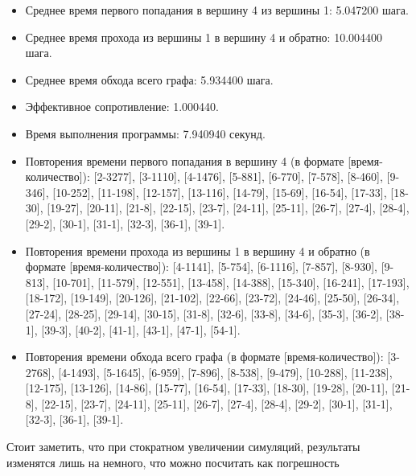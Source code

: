 \documentclass[utf8x]{G7-32} %
\begin{document}
\begin{itemize}
    \item Среднее время первого попадания в вершину 4 из вершины 1: 5.047200 шага.
    \item Среднее время прохода из вершины 1 в вершину 4 и обратно: 10.004400 шага.
    \item Среднее время обхода всего графа: 5.934400 шага.
    \item Эффективное сопротивление: 1.000440.
    \item Время выполнения программы: 7.940940 секунд.
    \item Повторения времени первого попадания в вершину 4 (в формате [время-количество]):
[2-3277], [3-1110], [4-1476], [5-881], [6-770], [7-578], [8-460], [9-346], [10-252], [11-198], [12-157], [13-116], [14-79], [15-69], [16-54], [17-33], [18-30], [19-27], [20-11], [21-8], [22-15], [23-7], [24-11], [25-11], [26-7], [27-4], [28-4], [29-2], [30-1], [31-1], [32-3], [36-1], [39-1].
    \item Повторения времени прохода из вершины 1 в вершину 4 и обратно (в формате [время-количество]):
[4-1141], [5-754], [6-1116], [7-857], [8-930], [9-813], [10-701], [11-579], [12-551], [13-458], [14-388], [15-340], [16-241], [17-193], [18-172], [19-149], [20-126], [21-102], [22-66], [23-72], [24-46], [25-50], [26-34], [27-24], [28-25], [29-14], [30-15], [31-8], [32-6], [33-8], [34-6], [35-3], [36-2], [38-1], [39-3], [40-2], [41-1], [43-1], [47-1], [54-1].
    \item Повторения времени обхода всего графа (в формате [время-количество]):
[3-2768], [4-1493], [5-1645], [6-959], [7-896], [8-538], [9-479], [10-288], [11-238], [12-175], [13-126], [14-86], [15-77], [16-54], [17-33], [18-30], [19-28], [20-11], [21-8], [22-15], [23-7], [24-11], [25-11], [26-7], [27-4], [28-4], [29-2], [30-1], [31-1], [32-3], [36-1], [39-1].
\end{itemize}
Стоит заметить, что при стократном увеличении симуляций, результаты изменятся лишь на немного, что можно посчитать как погрешность
\end{document}
